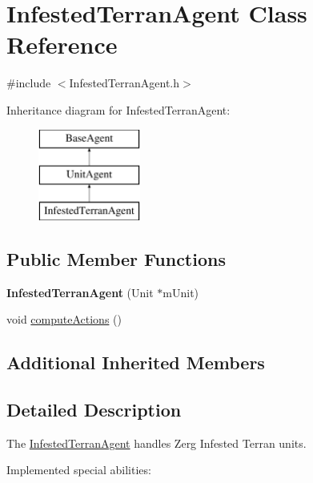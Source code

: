 \hypertarget{class_infested_terran_agent}{\section{Infested\-Terran\-Agent Class Reference}
\label{class_infested_terran_agent}
}


{\ttfamily \#include $<$Infested\-Terran\-Agent.\-h$>$}

Inheritance diagram for Infested\-Terran\-Agent\-:\begin{figure}[H]
\begin{center}
\leavevmode
\includegraphics[height=3.000000cm]{class_infested_terran_agent}
\end{center}
\end{figure}
\subsection*{Public Member Functions}
\begin{DoxyCompactItemize}
\item 
\hypertarget{class_infested_terran_agent_a3828921499d6a60aabdfef90370397e4}{{\bfseries Infested\-Terran\-Agent} (Unit $\ast$m\-Unit)}\label{class_infested_terran_agent_a3828921499d6a60aabdfef90370397e4}

\item 
void \hyperlink{class_infested_terran_agent_afa0932ddf33e826320547cc507941c0b}{compute\-Actions} ()
\end{DoxyCompactItemize}
\subsection*{Additional Inherited Members}


\subsection{Detailed Description}
The \hyperlink{class_infested_terran_agent}{Infested\-Terran\-Agent} handles Zerg Infested Terran units.

Implemented special abilities\-:
\begin{DoxyItemize}
\item 
\end{DoxyItemize}

